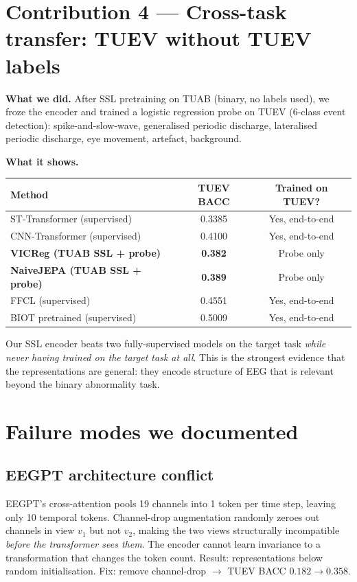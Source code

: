 \documentclass[11pt,a4paper]{article}
\begin{document}
\bigskip

\section{Contribution 4 — Cross-task transfer: TUEV without TUEV labels}

\textbf{What we did.}
After SSL pretraining on TUAB (binary, no labels used), we froze the encoder
and trained a logistic regression probe on TUEV (6-class event detection):
spike-and-slow-wave, generalised periodic discharge, lateralised periodic
discharge, eye movement, artefact, background.

\textbf{What it shows.}
\begin{center}
\begin{tabular}{lcc}
\toprule
Method & TUEV BACC & Trained on TUEV? \\
\midrule
ST-Transformer (supervised) & 0.3385 & Yes, end-to-end \\
CNN-Transformer (supervised) & 0.4100 & Yes, end-to-end \\
\midrule
\textbf{VICReg (TUAB SSL + probe)} & \textbf{0.382} & Probe only \\
\textbf{NaiveJEPA (TUAB SSL + probe)} & \textbf{0.389} & Probe only \\
\midrule
FFCL (supervised) & 0.4551 & Yes, end-to-end \\
BIOT pretrained (supervised) & 0.5009 & Yes, end-to-end \\
\bottomrule
\end{tabular}
\end{center}

Our SSL encoder beats two fully-supervised models on the target task \emph{while
never having trained on the target task at all}.  This is the strongest
evidence that the representations are general: they encode structure of EEG
that is relevant beyond the binary abnormality task.

\bigskip

\section{Failure modes we documented}

\subsection*{EEGPT architecture conflict}
EEGPT's cross-attention pools 19 channels into 1 token per time step, leaving
only 10 temporal tokens.  Channel-drop augmentation randomly zeroes out channels
in view $v_1$ but not $v_2$, making the two views structurally incompatible
\emph{before the transformer sees them}.  The encoder cannot learn invariance
to a transformation that changes the token count.  Result: representations
below random initialisation.  Fix: remove channel-drop $\to$ TUEV BACC
$0.182 \to 0.358$.
\end{document}
